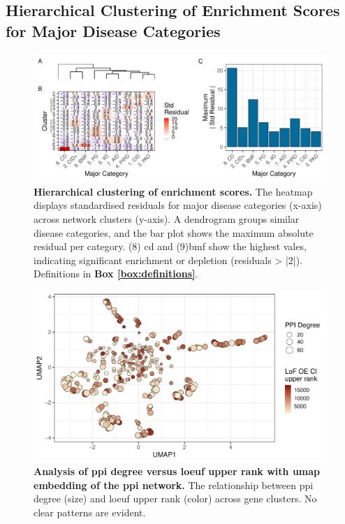 \subsection{Hierarchical Clustering of Enrichment Scores for Major Disease Categories}
\begin{figure}[ht]
  \centering
  \includegraphics[width=0.99\textwidth]{../images/untangleR_ppi_network_patch2_cator.pdf}
  \caption{
   \textbf{Hierarchical clustering of enrichment scores.}
    The heatmap displays standardised residuals for major disease categories (x-axis) across network clusters (y-axis). A dendrogram groups similar disease categories, and the bar plot shows the maximum absolute residual per category.  (8) \ac{cd} and (9)\ac{bmf} show the highest vales, indicating significant enrichment or depletion (residuals > |2|). Definitions in \textbf{Box \ref{box:definitions}}.
  }
  \label{fig:patch2}
\end{figure}

\begin{figure}[ht]
  \centering
  \includegraphics[width=0.99\textwidth]{../images/untangleR_ppi_network_p_umap_const.pdf}
  \caption{
   \textbf{Analysis of \ac{ppi} degree versus \ac{loeuf} upper rank with \ac{umap} embedding of the \ac{ppi} network.}
    The relationship between \ac{ppi} degree (size) and \ac{loeuf} upper rank (color) across gene clusters. No clear patterns are evident.
  }
  \label{fig:p_umap_const}
\end{figure}

